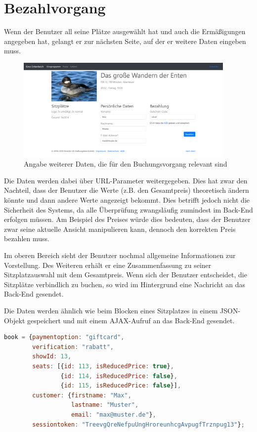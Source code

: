 \section{Bezahlvorgang}

Wenn der Benutzer all seine Plätze ausgewählt hat und auch die Ermäßigungen angegeben hat, gelangt er zur nächsten Seite, auf der er weitere Daten eingeben muss.

\begin{figure}[ht]
	\centering
	\includegraphics[width=0.95\textwidth]{img/screenshots/vorstellung03}
	\captionsetup{format=hang}
	\caption{Angabe weiterer Daten, die für den Buchungsvorgang relevant sind}
	\label{fig:vorstellung03}
\end{figure}

Die Daten werden dabei über \acs{URL}-Parameter weitergegeben.
Dies hat zwar den Nachteil, dass der Benutzer die Werte (z.B. den Gesamtpreis) theoretisch ändern könnte und dann andere Werte angezeigt bekommt.
Dies betrifft jedoch nicht die Sicherheit des Systems, da alle Überprüfung zwangsläufig zumindest im Back-End erfolgen müssen.
Am Beispiel des Preises würde dies bedeuten, dass der Benutzer zwar seine aktuelle Ansicht manipulieren kann, dennoch den korrekten Preis bezahlen muss.

Im oberen Bereich sieht der Benutzer nochmal allgemeine Informationen zur Vorstellung.
Des Weiteren erhält er eine Zusammenfassung zu seiner Sitzplatzauswahl mit dem Gesamtpreis.
Wenn sich der Benutzer entscheidet, die Sitzplätze verbindlich zu buchen, so wird im Hintergrund eine Nachricht an das Back-End gesendet.

Die Daten werden ähnlich wie beim Blocken eines Sitzplatzes in einem \acs{JSON}-Objekt gespeichert und mit einem \acs{AJAX}-Aufruf an das Back-End gesendet.

\begin{lstlisting}[language=JavaScript, caption={\acs{JSON}-Objekt für den Reservierungsvorgang}, label={lst:json_book}]
book = {paymentoption: "giftcard",
        verification: "rabatt",
        showId: 13,
        seats: [{id: 113, isReducedPrice: true},
                {id: 114, isReducedPrice: false},
                {id: 115, isReducedPrice: false}],
        customer: {firstname: "Max",
                   lastname: "Muster",
                   email: "max@muster.de"},
        sessiontoken: "TreevgQreNefpuUngHroreunhcgAvpugfTrznpug13"};
\end{lstlisting}

